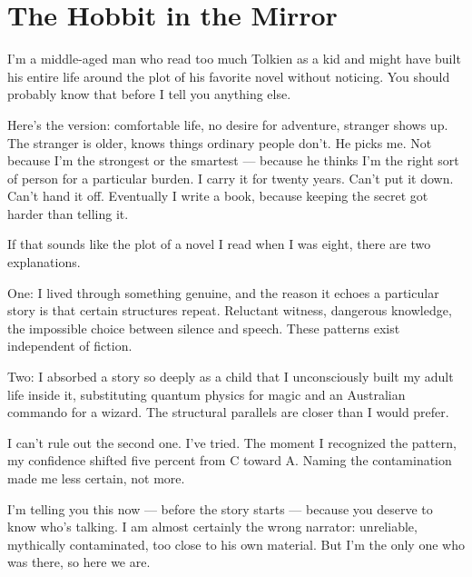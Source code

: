 
\chapter{The Hobbit in the Mirror}
\label{pos01b:hobbit-mirror}

I'm a middle-aged man who read too much Tolkien as a kid and might have built his entire life around the plot of his favorite novel without noticing. You should probably know that before I tell you anything else.

Here's the version: comfortable life, no desire for adventure, stranger shows up. The stranger is older, knows things ordinary people don't. He picks me. Not because I'm the strongest or the smartest --- because he thinks I'm the right sort of person for a particular burden. I carry it for twenty years. Can't put it down. Can't hand it off. Eventually I write a book, because keeping the secret got harder than telling it.

If that sounds like the plot of a novel I read when I was eight, there are two explanations.

One: I lived through something genuine, and the reason it echoes a particular story is that certain structures repeat. Reluctant witness, dangerous knowledge, the impossible choice between silence and speech. These patterns exist independent of fiction.

Two: I absorbed a story so deeply as a child that I unconsciously built my adult life inside it, substituting quantum physics for magic and an Australian commando for a wizard. The structural parallels are closer than I would prefer.

I can't rule out the second one. I've tried. The moment I recognized the pattern, my confidence shifted five percent from C toward A. Naming the contamination made me less certain, not more.

I'm telling you this now --- before the story starts --- because you deserve to know who's talking. I am almost certainly the wrong narrator: unreliable, mythically contaminated, too close to his own material. But I'm the only one who was there, so here we are.
